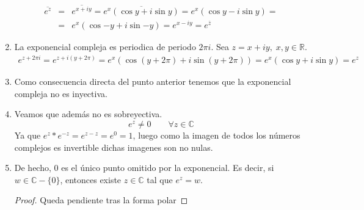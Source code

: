 \begin{enumerate}
    \begin{eqnarray*}
      \overline{e^z} & = & \overline{e^{x+iy}} = \overline{e^x(\cos{y}+i\sin{y})} = e^x(\cos{y}-i\sin{y}) = \\
                     & = & e^x(\cos{-y}+i\sin{-y}) = e^{x-iy} = e^{\overline{z}}
    \end{eqnarray*}
  \item La exponencial compleja es periodica de periodo \(2 \pi i \). Sea \(z=x+iy, \; x,y\in \mathbb{R}\).
    \begin{eqnarray*}
      e^{z+2\pi i} = e^{z+i(y+2\pi)} = e^x(\cos(y+2\pi)+i\sin(y+2\pi)) = e^x(\cos{y}+i\sin{y}) = e^z
    \end{eqnarray*}
  \item Como consecuencia directa del punto anterior tenemos que la exponencial compleja no es inyectiva.
  \item Veamos que además no es sobreyectiva.
    \[e^z \neq 0 \qquad \forall z \in \mathbb{C}\]
    Ya que \(e^z*e^{-z} = e^{z-z} = e^0 = 1\), luego como la imagen de todos los números complejos es invertible dichas imagenes son no nulas.
  \item De hecho, 0 es el único punto omitido por la exponencial. Es decir, si \(w\in \mathbb{C}-\{0\}\), entonces existe \(z\in \mathbb{C}\) tal que \(e^z=w\).
    \begin{proof}
      Queda pendiente tras la forma polar %
    \end{proof}

\end{enumerate}


